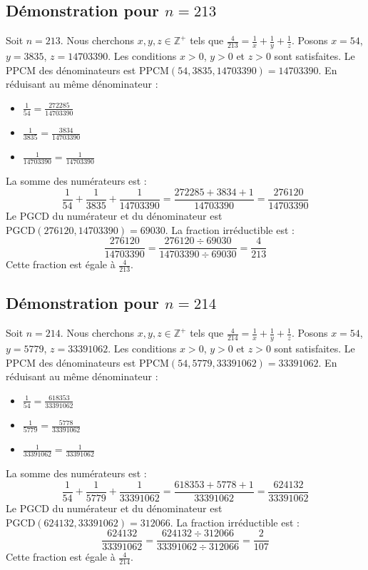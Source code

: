 \documentclass[11pt,a4paper]{article}
\begin{document}
\subsection{Démonstration pour $n = 213$}
Soit $n = 213$. Nous cherchons $x, y, z \in \mathbb{Z}^{+}$ tels que $\frac{4}{213} = \frac{1}{x} + \frac{1}{y} + \frac{1}{z}$.
Posons $x = 54$, $y = 3835$, $z = 14703390$.
Les conditions $x > 0$, $y > 0$ et $z > 0$ sont satisfaites.
Le PPCM des dénominateurs est $\text{PPCM}(54, 3835, 14703390) = 14703390$.
En réduisant au même dénominateur :
\begin{itemize}
    \item $\frac{1}{54} = \frac{272285}{14703390}$
    \item $\frac{1}{3835} = \frac{3834}{14703390}$
    \item $\frac{1}{14703390} = \frac{1}{14703390}$
\end{itemize}
La somme des numérateurs est :
$$ \frac{1}{54} + \frac{1}{3835} + \frac{1}{14703390} = \frac{272285 + 3834 + 1}{14703390} = \frac{276120}{14703390} $$
Le PGCD du numérateur et du dénominateur est $\text{PGCD}(276120, 14703390) = 69030$.
La fraction irréductible est :
$$ \frac{276120}{14703390} = \frac{276120 \div 69030}{14703390 \div 69030} = \frac{4}{213} $$
Cette fraction est égale à $\frac{4}{213}$.

\subsection{Démonstration pour $n = 214$}
Soit $n = 214$. Nous cherchons $x, y, z \in \mathbb{Z}^{+}$ tels que $\frac{4}{214} = \frac{1}{x} + \frac{1}{y} + \frac{1}{z}$.
Posons $x = 54$, $y = 5779$, $z = 33391062$.
Les conditions $x > 0$, $y > 0$ et $z > 0$ sont satisfaites.
Le PPCM des dénominateurs est $\text{PPCM}(54, 5779, 33391062) = 33391062$.
En réduisant au même dénominateur :
\begin{itemize}
    \item $\frac{1}{54} = \frac{618353}{33391062}$
    \item $\frac{1}{5779} = \frac{5778}{33391062}$
    \item $\frac{1}{33391062} = \frac{1}{33391062}$
\end{itemize}
La somme des numérateurs est :
$$ \frac{1}{54} + \frac{1}{5779} + \frac{1}{33391062} = \frac{618353 + 5778 + 1}{33391062} = \frac{624132}{33391062} $$
Le PGCD du numérateur et du dénominateur est $\text{PGCD}(624132, 33391062) = 312066$.
La fraction irréductible est :
$$ \frac{624132}{33391062} = \frac{624132 \div 312066}{33391062 \div 312066} = \frac{2}{107} $$
Cette fraction est égale à $\frac{4}{214}$.
\end{document}
